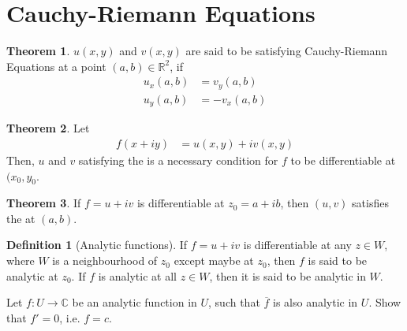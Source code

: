 \documentclass[fleqn, a4paper, 12pt, twoside]{article}
\theoremstyle{definition}
\newtheorem{definition}{Definition}
\theoremstyle{theorem}
\newtheorem{theorem}{Theorem}
\begin{document}
\section{Cauchy-Riemann Equations}

\begin{theorem}
	$u(x,y)$ and $v(x,y)$ are said to be satisfying Cauchy-Riemann Equations at a point $(a,b) \in \mathbb{R}^2$, if
	\begin{align*}
		u_x(a,b) & = v_y(a,b) \\
		u_y(a,b) & = -v_x(a,b)
	\end{align*}
	\label{Cauchy-Riemann_Equations}
\end{theorem}

\begin{theorem}
	Let
	\begin{align*}
		f(x + i y) & = u(x,y) + i v(x,y)
	\end{align*}
	Then, $u$ and $v$ satisfying the  is a necessary condition for $f$ to be differentiable at $(x_0,y_0$.
\end{theorem}

\begin{theorem}
	If $f = u + i v$ is differentiable at $z_0 = a + i b$, then $(u,v)$ satisfies the  at $(a,b)$.
\end{theorem}

\begin{definition}[Analytic functions]
	If $f = u + i v$ is differentiable at any $z \in W$, where $W$ is a neighbourhood of $z_0$ except maybe at $z_0$, then $f$ is said to be analytic at $z_0$.
	If $f$ is analytic at all $z \in W$, then it is said to be analytic in $W$.
\end{definition}

\begin{question}
	Let $f : U \to \mathbb{C}$ be an analytic function in $U$, such that $\overline{f}$ is also analytic in $U$.
	Show that $f' = 0$, i.e. $f = c$.
\end{question}
\end{document}
